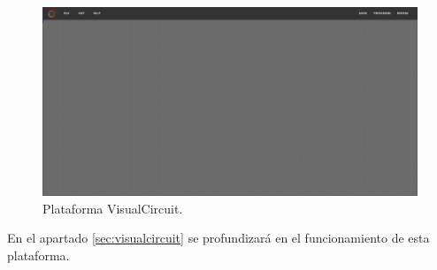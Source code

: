 \begin{figure} [H]
  \begin{center}
    \includegraphics[width=12cm]{figs/c1/empty_VC.png}
  \end{center}
  \caption[Plataforma VisualCircuit]{Plataforma VisualCircuit.}
  \label{fig:VC_plat}
\end{figure}

En el apartado \ref{sec:visualcircuit} se profundizará en el funcionamiento de esta plataforma.